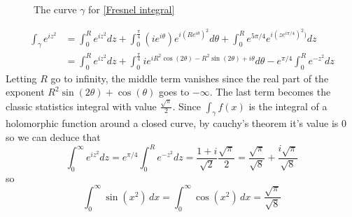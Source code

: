 \documentclass{homework}
\begin{document}
              \begin{figure}[h]
                          \caption{The curve $\gamma$ for \ref{Fresnel integral}}
                          \label{octant-tikz}
                          \end{figure}
                          \begin{align*}
                          \int_\gamma e^{iz^2}
                          &= \int_0^R e^{iz^2}dz + \int_0^{\frac{\pi}{4}} (ie^{i\theta}) e^{i(Re^{i\theta})^2} d\theta + \int_0^R e^{5\pi/4}e^{i(ze^{i\pi/4})^2)}dz \\
                          &= \int_0^R e^{iz^2}dz + \int_0^{\frac{\pi}{4}} ie^{iR^2\cos(2\theta) - R^2\sin(2\theta) + i\theta} d\theta - e^{\pi/4} \int_0^R e^{-z^2}dz
                          \end{align*}
                          Letting $R$ go to infinity, the middle term vanishes since the real part of the exponent $R^2\sin(2\theta) + \cos(\theta)$ goes to $-\infty$. The last term becomes the classic statistics integral with value $\frac{\sqrt{\pi}}{2}$. Since $\int_\gamma f(x)$ is the integral of a holomorphic function around a closed curve, by cauchy's theorem it's value is 0 so we can deduce that 
                          \[\int_0^\infty e^{iz^2}dz = e^{\pi/4} \int_0^R e^{-z^2}dz =  \frac{1+i}{\sqrt{2}}\frac{\sqrt{\pi}}{2} = \frac{\sqrt{\pi}}{\sqrt{8}} + \frac{i\sqrt{\pi}}{\sqrt{8}}\]
                          so 
                            \[
                                \int_0^\infty \sin \left( x^2 \right) \, dx = \int_0^\infty \cos \left( x^2 \right) \, dx = \frac{\sqrt{\pi}}{\sqrt{8}}
                                  \]
\end{document}
